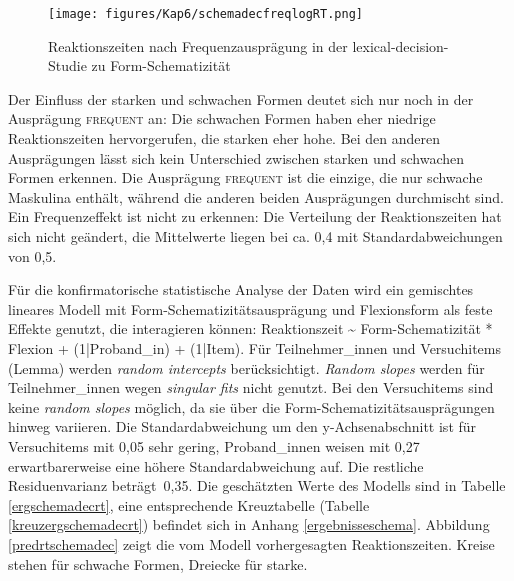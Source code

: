 \begin{figure}
\texttt{[image: figures/Kap6/schemadecfreqlogRT.png]} 
\caption{Reaktionszeiten nach Frequenzausprägung in der lexical-decision-Studie zu Form-Schematizität}
\label{schemadecfreqlogRT}
\end{figure}

Der Einfluss der starken und schwachen Formen deutet sich nur noch in der Ausprägung \textsc{frequent} an: Die schwachen Formen haben eher niedrige Reaktionszeiten hervorgerufen, die starken eher hohe. Bei den anderen Ausprägungen lässt sich kein Unterschied zwischen starken und schwachen Formen erkennen. Die Ausprägung \textsc{frequent} ist die einzige, die nur schwache Maskulina enthält, während die anderen beiden Ausprägungen durchmischt sind. Ein Frequenzeffekt ist nicht zu erkennen: Die Verteilung der Reaktionszeiten hat sich nicht geändert, die Mittelwerte liegen bei ca. 0,4 mit Standardabweichungen von 0,5. 

Für die konfirmatorische statistische Analyse der Daten wird ein gemischtes lineares Modell mit Form-Schematizitätsausprägung und Flexionsform als feste Effekte genutzt, die interagieren können: Reaktionszeit \~{} Form-Schematizität * Flexion + (1|Proband\_in) + (1|Item). Für Teilnehmer\_innen und Versuchitems (Lemma) werden \textit{random intercepts} berücksichtigt. \textit{Random slopes} werden für Teilnehmer\_innen wegen \textit{singular fits} nicht genutzt. Bei den Versuchitems sind keine \textit{random slopes} möglich, da sie über die Form-Schematizitätsausprägungen hinweg variieren. Die Standardabweichung um den y-Ach\-sen\-ab\-schnitt ist für Versuchitems mit 0,05 sehr gering, Proband\_innen weisen mit 0,27  erwartbarerweise eine höhere Standardabweichung auf. Die restliche Residuenvarianz beträgt~0,35. Die geschätzten Werte des Modells sind in Tabelle \ref{ergschemadecrt}, eine entsprechende Kreuztabelle (Tabelle \ref{kreuzergschemadecrt}) befindet sich in Anhang \ref{ergebnisseschema}. Abbildung \ref{predrtschemadec} zeigt die vom Modell vorhergesagten Reaktionszeiten. Kreise stehen für schwache Formen, Dreiecke für starke.

